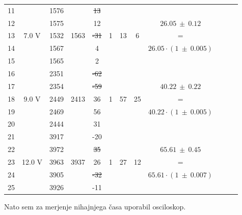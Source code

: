 \documentclass{report}
\begin{document}
{\begin{table}[H]
\begin{adjustwidth}{-3.5 cm}{0 cm}
\begin{tabular}{cccccccccccc}

\midrule
11 & \multirow{5}{*}{7.0 V} & 1576 & \multirow{5}{*}{1563} & \sout{13} & \multirow{5}{*}{1} & \multirow{5}{*}{13}  & \multirow{5}{*}{6} & \\
12 & & 1575 & & 12 & & & & $ 26.05 \ \pm \ 0.12 $\\
13 & & 1532 & & \sout{-31} & & & & =\\
14 & & 1567 & & 4 & & & & $26.05 \cdot (1 \ \pm \ 0.005)$\\
15 & & 1565 & & 2 &\\


\midrule
16 & \multirow{5}{*}{9.0 V} & 2351 & \multirow{5}{*}{2413} & \sout{-62} & \multirow{5}{*}{1} & \multirow{5}{*}{57} & \multirow{5}{*}{25} & \\
17 & & 2354 & & \sout{-59} & & & & $ 40.22 \ \pm \ 0.22 $\\
18 & & 2449 & & 36 & & & & =\\
19 & & 2469 & & 56 & & & & $40.22 \cdot (1 \ \pm \ 0.005)  $\\
20 & & 2444 & & 31 &\\


\midrule
21 & \multirow{5}{*}{12.0 V} & 3917 & \multirow{5}{*}{3937} & -20 & \multirow{5}{*}{1} & \multirow{5}{*}{27} & \multirow{5}{*}{12} & \\
22 & & 3972 & & \sout{35} & & & & $65.61 \ \pm \ 0.45$\\
23 & & 3963 & & 26 & & & & =\\
24 & & 3905 & & \sout{-32} & & & & $65.61 \cdot (1 \ \pm \ 0.007) $\\
25 & & 3926 & & -11\\
\bottomrule
\end{tabular}
\end{adjustwidth}
\end{table}
}
\pagebreak






Nato sem za merjenje nihajnjega časa uporabil osciloskop.
\end{document}
